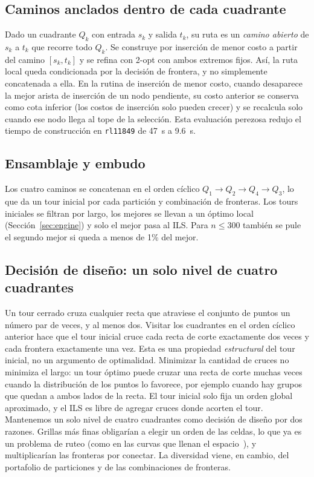 \documentclass[runningheads]{llncs}
\begin{document}
\subsection{Caminos anclados dentro de cada cuadrante}

Dado un cuadrante $Q_k$ con entrada $s_k$ y salida $t_k$, su ruta es un
\emph{camino abierto} de $s_k$ a $t_k$ que recorre todo $Q_k$. Se
construye por inserción de menor costo a partir del camino $[s_k,t_k]$ y
se refina con 2-opt con ambos extremos fijos. Así, la ruta local queda
condicionada por la decisión de frontera, y no simplemente concatenada a
ella. En la rutina de inserción de menor costo, cuando desaparece la
mejor arista de inserción de un nodo pendiente, su costo anterior se
conserva como cota inferior (los costos de inserción solo pueden crecer)
y se recalcula solo cuando ese nodo llega al tope de la selección. Esta
evaluación perezosa redujo el tiempo de construcción en
\texttt{rl11849} de 47~s a 9.6~s.

\subsection{Ensamblaje y embudo}

Los cuatro caminos se concatenan en el orden cíclico
$Q_1\!\to\!Q_2\!\to\!Q_4\!\to\!Q_3$, lo que da un tour inicial por cada
partición y combinación de fronteras. Los tours iniciales se filtran por
largo, los mejores se llevan a un óptimo local
(Sección~\ref{sec:engine}) y solo el mejor pasa al ILS. Para $n\le 300$
también se pule el segundo mejor si queda a menos de 1\% del mejor.

\subsection{Decisión de diseño: un solo nivel de cuatro cuadrantes}
\label{sec:quadrants}

Un tour cerrado cruza cualquier recta que atraviese el conjunto de puntos
un número par de veces, y al menos dos. Visitar los cuadrantes en el
orden cíclico anterior hace que el tour inicial cruce cada recta de corte
exactamente dos veces y cada frontera exactamente una vez. Esta es una
propiedad \emph{estructural} del tour inicial, no un argumento de
optimalidad. Minimizar la cantidad de cruces no minimiza el largo: un
tour óptimo puede cruzar una recta de corte muchas veces cuando la
distribución de los puntos lo favorece, por ejemplo cuando hay grupos que
quedan a ambos lados de la recta. El tour inicial solo fija un orden
global aproximado, y el ILS es libre de agregar cruces donde acorten el
tour. Mantenemos un solo nivel de cuatro cuadrantes como decisión de
diseño por dos razones. Grillas más finas obligarían a elegir un orden de
las celdas, lo que ya es un problema de ruteo (como en las curvas que
llenan el espacio~\cite{bartholdi1982spacefilling}), y multiplicarían las
fronteras por conectar. La diversidad viene, en cambio, del portafolio de
particiones y de las combinaciones de fronteras.
\end{document}
